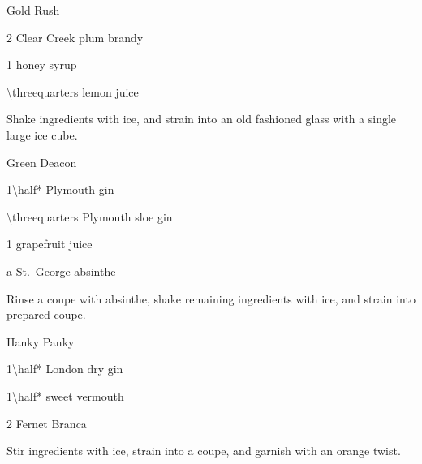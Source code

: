 \newcommand\MilkAndHoneyLogo{\textit{\raisebox{1ex}{$\mathscr{M}$}\!\&\raisebox{-1ex}{$\mathscr{H}$}}}
\newenvironment{MHCocktail}[1]
	{%
		\begin{Cocktail}[\Attribution{\MilkAndHoneyLogo}]{#1}
	}
	{%
		\end{Cocktail}
	}
\begin{MHCocktail}{Gold Rush}
	\begin{Ingredients}
	\item \SI{2}{\oz} Clear Creek plum brandy
	\item \SI{1}{\oz} honey syrup
	\item \SI{\threequarters}{\oz} lemon juice
	\end{Ingredients}
	
	\begin{Instructions}
	Shake ingredients with ice, and strain into an old fashioned glass with a single large ice cube.
	\end{Instructions}
\end{MHCocktail}

\begin{PDTCocktail}{Green Deacon}
	\begin{Ingredients}
	\item \SI{1\half*}{\oz} Plymouth gin
	\item \SI{\threequarters}{\oz} Plymouth sloe gin
	\item \SI{1}{\oz} grapefruit juice
	\item a \si{\dash} St.\ George absinthe
	\end{Ingredients}
	
	\begin{Instructions}
	Rinse a coupe with absinthe, shake remaining ingredients with ice, and strain into prepared coupe.
	\end{Instructions}
\end{PDTCocktail}

\newcommand\SavoyLogo{\textit{\raisebox{1ex}{S}\!C\raisebox{-1ex}{B}}}
\newenvironment{SCBCocktail}[1]
	{%
		\begin{Cocktail}[\Attribution{\SavoyLogo}]{#1}
	}
	{%
		\end{Cocktail}
	}
\begin{SCBCocktail}{Hanky Panky}
	\begin{Ingredients}
	\item \SI{1\half*}{\oz} London dry gin
	\item \SI{1\half*}{\oz} sweet vermouth
	\item 2 \si{\dashes} Fernet Branca
	\end{Ingredients}
	
	\begin{Instructions}
	Stir ingredients with ice, strain into a coupe, and garnish with an orange twist.
	\end{Instructions}
\end{SCBCocktail}

